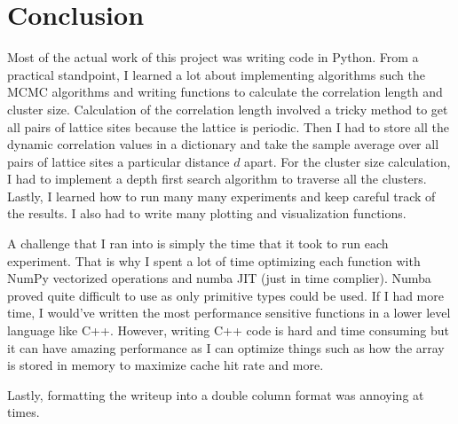 \documentclass{article}
\begin{document}
\section{Conclusion}
Most of the actual work of this project was writing code in Python. From a practical standpoint, I learned a lot about implementing algorithms such
the MCMC algorithms and writing functions to calculate the correlation length and cluster size. Calculation of the correlation length involved a tricky
method to get all pairs of lattice sites because the lattice is periodic. Then I had to store all the dynamic correlation values in a dictionary and take the sample
average over all pairs of lattice sites a particular distance $d$ apart. For the cluster size calculation, I had to implement a depth first search algorithm
to traverse all the clusters. Lastly, I learned how to run many many experiments and keep careful track of the results. I also had to write many plotting 
and visualization functions. 

A challenge that I ran into is simply the time that it took to run each experiment. That is why I spent a lot of time optimizing each function with NumPy vectorized
operations and numba JIT (just in time complier). Numba proved quite difficult to use as only primitive types could be used. If I had more time, I would've written the most performance sensitive functions
in a lower level language like C++. However, writing C++ code is hard and time consuming but it can have amazing performance as I can optimize things such as how the array
is stored in memory to maximize cache hit rate and more.

Lastly, formatting the writeup into a double column format was annoying at times.


\end{document}

